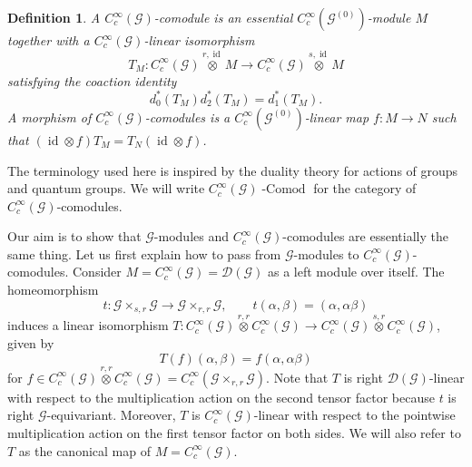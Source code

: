 \documentclass{amsart}
\newtheorem{dfn}[thm]{Definition}
\newcommand{\G}{\mathcal{G}}
\newcommand{\DG}{\mathcal{D}(\mathcal{G})}
\newcommand{\ccinfty}{C_c^\infty}
\DeclareMathOperator{\id}{id}
\begin{document}
\begin{dfn}
A $ \ccinfty(\G) $-comodule is an essential $ \ccinfty(\G^{(0)}) $-module $ M $ together with a $ \ccinfty(\G) $-linear isomorphism 
$$
T_M:\ccinfty(\G)\stackrel{r,\id}{\otimes} M \rightarrow \ccinfty(\G)\stackrel{s,\id}{\otimes} M
$$
satisfying the coaction identity 
$$ 
d_0^*(T_M) d_2^*(T_M) = d_1^*(T_M).
$$
A morphism of $ \ccinfty(\G) $-comodules is a $ \ccinfty(\G^{(0)}) $-linear map $ f: M \rightarrow N $ such that $ (\id \otimes f)T_M = T_N (\id \otimes f) $. 
\end{dfn}

The terminology used here is inspired by the duality theory for actions of groups and quantum groups. We will write $ \ccinfty(\G) \operatorname{-Comod} $ for the category of $ \ccinfty(\G) $-comodules. 

Our aim is to show that $ \G $-modules and $ \ccinfty(\G) $-comodules are essentially the same thing.  Let us first explain how to pass from $ \G $-modules to $ \ccinfty(\G) $-comodules. Consider $ M = \ccinfty(\G) = \DG $ as a left module over itself. The homeomorphism  
$$ 
t: \G \times_{s,r} \G \rightarrow \G \times_{r,r} \G, \qquad t(\alpha, \beta) = (\alpha, \alpha \beta)  
$$ 
induces a linear isomorphism $ T: \ccinfty(\G) \stackrel{r,r}{\otimes} \ccinfty(\G)\rightarrow \ccinfty(\G)\stackrel{s,r}{\otimes} \ccinfty(\G) $, given by 
$$
T(f)(\alpha, \beta) = f(\alpha, \alpha \beta)
$$
for $ f \in \ccinfty(\G) \stackrel{r,r}{\otimes} \ccinfty(\G) = \ccinfty(\G \times_{r,r} \G) $. Note that $ T $ is right $ \DG $-linear with respect to the multiplication action on the second tensor factor because $ t $ is right $ \G $-equivariant. Moreover, $ T $ is $ \ccinfty(\G) $-linear with respect to the pointwise multiplication action on the first tensor factor on both sides. We will also refer to $ T $ as the canonical map of $ M = \ccinfty(\G) $. 
\end{document}
